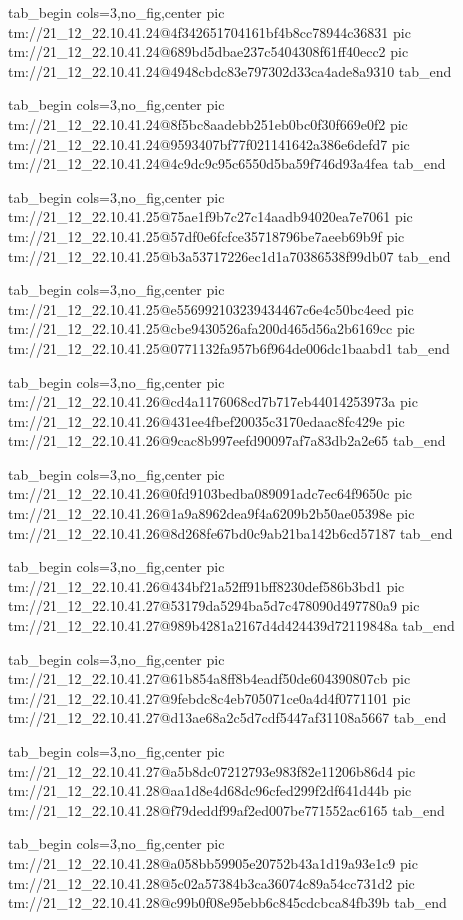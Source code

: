 \ifcmt
  tab_begin cols=3,no_fig,center
    pic tm://21_12_22.10.41.24@4f342651704161bf4b8cc78944c36831
    pic tm://21_12_22.10.41.24@689bd5dbae237c5404308f61ff40ecc2
    pic tm://21_12_22.10.41.24@4948cbdc83e797302d33ca4ade8a9310
  tab_end
\fi


\ifcmt
  tab_begin cols=3,no_fig,center
    pic tm://21_12_22.10.41.24@8f5bc8aadebb251eb0bc0f30f669e0f2
    pic tm://21_12_22.10.41.24@9593407bf77f021141642a386e6defd7
    pic tm://21_12_22.10.41.24@4c9dc9c95c6550d5ba59f746d93a4fea
  tab_end
\fi


\ifcmt
  tab_begin cols=3,no_fig,center
    pic tm://21_12_22.10.41.25@75ae1f9b7c27c14aadb94020ea7e7061
    pic tm://21_12_22.10.41.25@57df0e6fcfce35718796be7aeeb69b9f
    pic tm://21_12_22.10.41.25@b3a53717226ec1d1a70386538f99db07
  tab_end
\fi


\ifcmt
  tab_begin cols=3,no_fig,center
    pic tm://21_12_22.10.41.25@e556992103239434467c6e4c50bc4eed
    pic tm://21_12_22.10.41.25@cbe9430526afa200d465d56a2b6169cc
    pic tm://21_12_22.10.41.25@0771132fa957b6f964de006dc1baabd1
  tab_end
\fi


\ifcmt
  tab_begin cols=3,no_fig,center
    pic tm://21_12_22.10.41.26@cd4a1176068cd7b717eb44014253973a
    pic tm://21_12_22.10.41.26@431ee4fbef20035c3170edaac8fc429e
    pic tm://21_12_22.10.41.26@9cac8b997eefd90097af7a83db2a2e65
  tab_end
\fi


\ifcmt
  tab_begin cols=3,no_fig,center
    pic tm://21_12_22.10.41.26@0fd9103bedba089091adc7ec64f9650c
    pic tm://21_12_22.10.41.26@1a9a8962dea9f4a6209b2b50ae05398e
    pic tm://21_12_22.10.41.26@8d268fe67bd0c9ab21ba142b6cd57187
  tab_end
\fi


\ifcmt
  tab_begin cols=3,no_fig,center
    pic tm://21_12_22.10.41.26@434bf21a52ff91bff8230def586b3bd1
    pic tm://21_12_22.10.41.27@53179da5294ba5d7c478090d497780a9
    pic tm://21_12_22.10.41.27@989b4281a2167d4d424439d72119848a
  tab_end
\fi


\ifcmt
  tab_begin cols=3,no_fig,center
    pic tm://21_12_22.10.41.27@61b854a8ff8b4eadf50de604390807cb
    pic tm://21_12_22.10.41.27@9febdc8c4eb705071ce0a4d4f0771101
    pic tm://21_12_22.10.41.27@d13ae68a2c5d7cdf5447af31108a5667
  tab_end
\fi


\ifcmt
  tab_begin cols=3,no_fig,center
    pic tm://21_12_22.10.41.27@a5b8dc07212793e983f82e11206b86d4
    pic tm://21_12_22.10.41.28@aa1d8e4d68dc96cfed299f2df641d44b
    pic tm://21_12_22.10.41.28@f79deddf99af2ed007be771552ac6165
  tab_end
\fi


\ifcmt
  tab_begin cols=3,no_fig,center
    pic tm://21_12_22.10.41.28@a058bb59905e20752b43a1d19a93e1c9
    pic tm://21_12_22.10.41.28@5c02a57384b3ca36074c89a54cc731d2
    pic tm://21_12_22.10.41.28@c99b0f08e95ebb6c845cdcbca84fb39b
  tab_end
\fi



